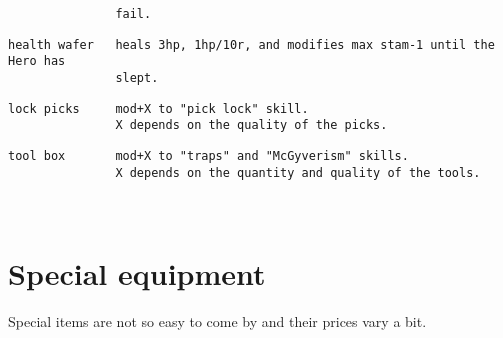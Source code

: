 \begin{samepage}
\begin{verbatim}
               fail.
\end{verbatim} \blocklistgap \begin{verbatim}
health wafer   heals 3hp, 1hp/10r, and modifies max stam-1 until the Hero has
               slept.
\end{verbatim} \blocklistgap \begin{verbatim}
lock picks     mod+X to "pick lock" skill.
               X depends on the quality of the picks.
\end{verbatim} \blocklistgap \begin{verbatim}
tool box       mod+X to "traps" and "McGyverism" skills.
               X depends on the quantity and quality of the tools.
\end{verbatim} \end{samepage} \normalsize

\










\section*{Special equipment}

Special items are not so easy to come by and their prices vary a bit.

\

